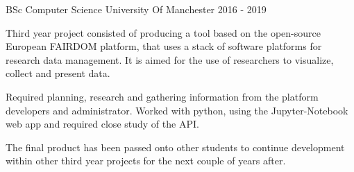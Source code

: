 \cventry
    {BSc Computer Science} %
    {University Of Manchester} %
    {} %
    {2016 - 2019} %
    {\begin{cvitems}
        \item{Third year project consisted of producing a tool based on the open-source European FAIRDOM platform, that uses a stack of software platforms for research data management. It is aimed for the use of researchers to visualize, collect and present data.}
        \item{Required planning, research and gathering information from the platform developers and administrator. Worked with python, using the Jupyter-Notebook web app and required close study of the API.}
        \item{The final product has been passed onto other students to continue development within other third year projects for the next couple of years after.}
    \end{cvitems}}